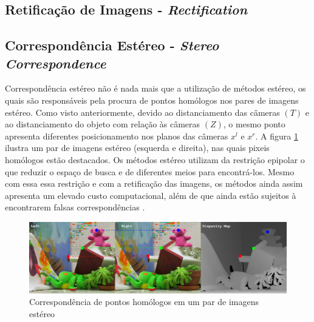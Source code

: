 \subsection{Retificação de Imagens  - \textit{Rectification}}



\subsection{Correspondência Estéreo - \textit{Stereo Correspondence}}

Correspondência estéreo não é nada mais que a utilização de métodos estéreo, os quais são responsáveis pela procura de pontos homólogos nos pares de imagens estéreo. Como visto anteriormente, devido ao distanciamento das câmeras $(T)$ e ao distanciamento do objeto com relação às câmeras $(Z)$, o mesmo ponto apresenta diferentes posicionamento nos planos das câmeras $x^l$ e $x^r$. A figura \ref{homologous_points _stereo} ilustra um par de imagens estéreo (esquerda e direita), nas quais pixeis homólogos estão destacados. Os métodos estéreo utilizam da restrição epipolar o que reduzir o espaço de busca e de diferentes meios para encontrá-los. Mesmo com essa essa restrição e com a retificação das imagens, os métodos ainda assim apresenta um elevado custo computacional, além de que ainda estão sujeitos à encontrarem falsas correspondências \cite{Bradski2008}. 

\begin{figure}[H]
 	\centering
 	\includegraphics[scale=0.35]{./Resources/homologous_points_stereo.png}
 	\caption{Correspondência de pontos homólogos em um par de imagens estéreo}
 	\label{homologous_points _stereo}
\end{figure}

